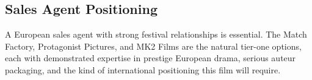\subsection{Sales Agent Positioning}

A European sales agent with strong festival relationships is essential. The Match Factory, Protagonist Pictures, and MK2 Films are the natural tier-one options, each with demonstrated expertise in prestige European drama, serious auteur packaging, and the kind of international positioning this film will require.
